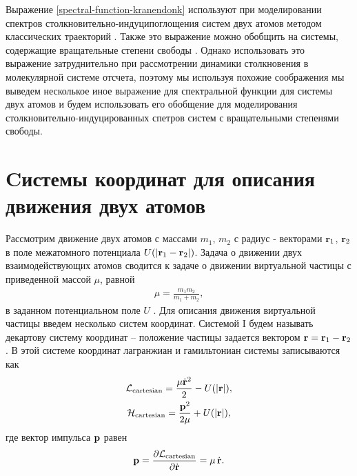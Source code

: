 Выражение \eqref{spectral-function-kranendonk} используют при моделировании спектров столкновительно-индуци поглощения систем двух атомов методом классических траекторий \cite{levine1967, mcquarrie1968, buryak2014}. Также это выражение можно обобщить на системы, содержащие вращательные степени свободы \cite{oparin2017}. Однако использовать это выражение затруднительно при рассмотрении динамики столкновения в молекулярной системе отсчета, поэтому мы используя похожие соображения мы выведем несколькое иное выражение для спектральной функции для системы двух атомов и будем использовать его обобщение для моделирования столкновительно-индуцированных спетров систем с вращательными степенями свободы.  

\section{Cистемы координат для описания движения двух атомов}

Рассмотрим движение двух атомов с массами $m_1$, $m_2$ с радиус - векторами $\mathbf{r}_1$, $\mathbf{r}_2$ в поле межатомного потенциала $U(\vert \mathbf{r}_1 - \mathbf{r}_2 \vert)$. Задача о движении двух взаимодействующих атомов сводится к задаче о движении виртуальной частицы с приведенной массой $\mu$,  равной 
\begin{gather}
    \mu = \frac{m_1 m_2}{m_1 + m_2}, 
\end{gather}
%
в заданном потенциальном поле $U$ \cite{landau-volume1}. Для описания движения виртуальной частицы введем несколько систем координат. Системой I будем называть декартову систему координат -- положение частицы задается вектором $\mathbf{r} = \mathbf{r}_1 - \mathbf{r}_2$. В этой системе координат лагранжиан и гамильтониан системы записываются как 
\begin{gather}
    \mathcal{L}_\text{cartesian} = \frac{\mu \dot{\mathbf{r}}^2}{2} - U( \vert \mathbf{r} \vert ), \label{two-atom-cartesian-lagrangian} \\
    \mathcal{H}_\text{cartesian} = \frac{\mathbf{p}^2}{2\mu} + U( \vert \mathbf{r} \vert ), \label{two-atom-cartesian-hamiltonian}
\end{gather}
%
где вектор импульса $\mathbf{p}$ равен
\begin{gather}
    \mathbf{p} = \frac{\partial \mathcal{L}_\text{cartesian}}{\partial \dot{\mathbf{r}}} = \mu \, \dot{\mathbf{r}}. \label{two-atom-cartesian-momenta}
\end{gather}

